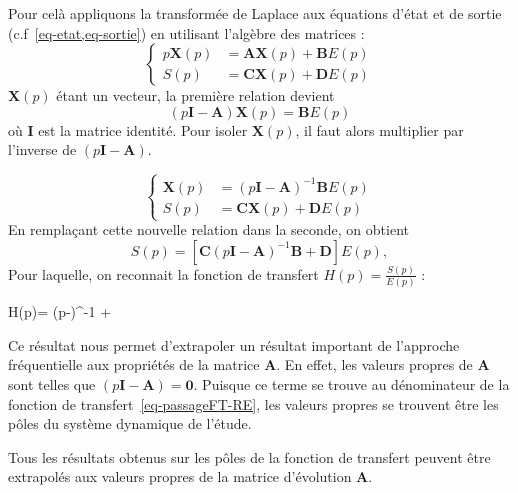 Pour celà appliquons la transformée de Laplace aux équations d'état et de 
sortie (c.f~\cref{eq-etat,eq-sortie}) en utilisant l'algèbre des matrices :
\[
    \begin{cases}
        p\boldsymbol{X}(p)&=\boldsymbol{AX}(p)+\boldsymbol{B}E(p) \\
        S(p) &= \boldsymbol{CX}(p)+\boldsymbol{D}E(p)
    \end{cases}
\]
$\boldsymbol{X}(p)$ étant un vecteur, la première relation devient 
\[
    (p\boldsymbol{I}-\boldsymbol{A})\boldsymbol{X}(p)=\boldsymbol{B}E(p)
\]
où $\boldsymbol{I}$ est la matrice identité. Pour isoler $\boldsymbol{X}(p)$, 
il faut alors multiplier par l'inverse de $(p\boldsymbol{I}-\boldsymbol{A})$.

\[
\begin{cases}
\boldsymbol{X}(p)&=(p\boldsymbol{I}-\boldsymbol{A})^{-1}\boldsymbol{B}E(p) \\
 S(p)&=\boldsymbol{CX}(p)+\boldsymbol{D}E(p)
\end{cases}
\]
En remplaçant cette nouvelle relation dans la seconde, on obtient 
\[
    S(p)=\left[\boldsymbol{C}(p\boldsymbol{I}-\boldsymbol{A})^{-1}
         \boldsymbol{B}+\boldsymbol{D}\right]E(p),
\]
Pour laquelle, on reconnait la fonction de transfert $H(p)=\frac{S(p)}{E(p)}$ :
\begin{bequation}
    H(p)=
          \left(p-\right)^{-1}
          +
          \label{eq-passageFT-RE}
\end{bequation}
Ce résultat nous permet d'extrapoler un résultat important de l'approche 
fréquentielle aux propriétés de la matrice $\boldsymbol{A}$. En effet, les
valeurs propres de $\boldsymbol{A}$ sont telles que 
$\left(p\boldsymbol{I}-\boldsymbol{A}\right)=\boldsymbol{0}$. Puisque ce terme 
se trouve au dénominateur de la fonction de transfert~\cref{eq-passageFT-RE},
les valeurs propres se trouvent être les pôles du système dynamique de l'étude.

Tous les résultats obtenus sur les pôles de la fonction de transfert peuvent
être extrapolés aux valeurs propres de la matrice d'évolution $\boldsymbol{A}$.

\captionsetup{width=0.9\linewidth}
